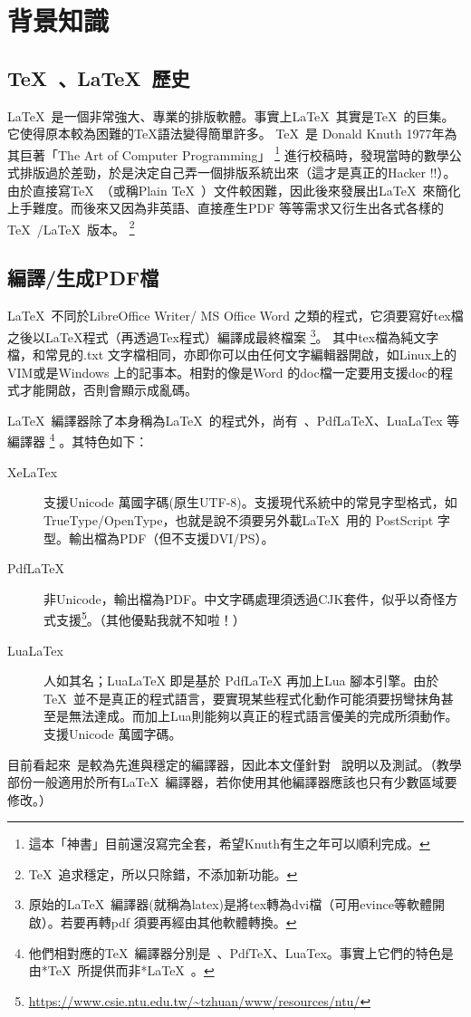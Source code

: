 \documentclass[class=NCU_thesis, crop=false, float=true]{standalone}
\begin{document}
\section{背景知識}

\subsection{\TeX\ 、\LaTeX\ 歷史}
\LaTeX\  是一個非常強大、專業的排版軟體。事實上\LaTeX\ 其實是\TeX\ 的巨集。它使得原本較為困難的TeX語法變得簡單許多。
\TeX\  是 Donald Knuth 1977年為其巨著「The Art of Computer Programming」
\footnote{這本「神書」目前還沒寫完全套，希望Knuth有生之年可以順利完成。}
進行校稿時，發現當時的數學公式排版過於差勁，於是決定自己弄一個排版系統出來（這才是真正的Hacker !!）。由於直接寫\TeX\ （或稱Plain \TeX\ ）文件較困難，因此後來發展出\LaTeX\ 來簡化上手難度。而後來又因為非英語、直接產生PDF 等等需求又衍生出各式各樣的\TeX\ /\LaTeX\ 版本。
\footnote{\TeX\  追求穩定，所以只除錯，不添加新功能。}

\subsection{編譯/生成PDF檔}
\LaTeX\  不同於LibreOffice Writer/ MS Office Word 之類的程式，它須要寫好tex檔之後以LaTeX程式（再透過Tex程式）編譯成最終檔案
\footnote{原始的\LaTeX\ 編譯器(就稱為latex)是將tex轉為dvi檔（可用evince等軟體開啟）。若要再轉pdf 須要再經由其他軟體轉換。}。%
其中tex檔為純文字檔，和常見的.txt 文字檔相同，亦即你可以由任何文字編輯器開啟，如Linux上的VIM或是Windows 上的記事本。相對的像是Word 的doc檔一定要用支援doc的程式才能開啟，否則會顯示成亂碼。

\LaTeX\  編譯器除了本身稱為\LaTeX\ 的程式外，尚有\XeLaTeX\ 、PdfLaTeX、LuaLaTex 等編譯器
\footnote{他們相對應的\TeX\ 編譯器分別是\XeTeX\ 、PdfTeX、LuaTex。事實上它們的特色是由*\TeX\  所提供而非*\LaTeX\ 。}
。其特色如下：
\begin{description}
    \item[XeLaTex]  支援Unicode 萬國字碼(原生UTF-8)。支援現代系統中的常見字型格式，如TrueType/OpenType，也就是說不須要另外載\LaTeX\  用的 PostScript 字型。輸出檔為PDF（但不支援DVI/PS）。
    \item[PdfLaTeX] 非Unicode，輸出檔為PDF。中文字碼處理須透過CJK套件，似乎以奇怪方式支援\footnote{\url{https://www.csie.ntu.edu.tw/~tzhuan/www/resources/ntu/}}。（其他優點我就不知啦！）
    \item[LuaLaTex] 人如其名；LuaLaTeX 即是基於 PdfLaTeX 再加上Lua 腳本引擎。由於 \TeX\  並不是真正的程式語言，要實現某些程式化動作可能須要拐彎抹角甚至是無法達成。而加上Lua則能夠以真正的程式語言優美的完成所須動作。支援Unicode 萬國字碼。
\end{description}
目前看起來\XeLaTeX\ 是較為先進與穩定的編譯器，因此本文僅針對 \XeLaTeX\  說明以及測試。（教學部份一般適用於所有\LaTeX\  編譯器，若你使用其他編譯器應該也只有少數區域要修改。）
\end{document}

